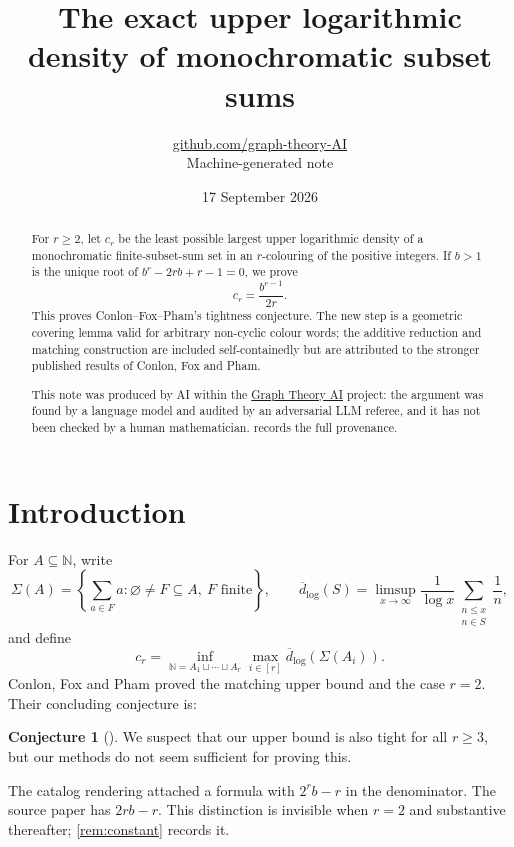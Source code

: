 \documentclass[11pt,a4paper]{article}
\title{The exact upper logarithmic density of monochromatic subset sums}
\author{\href{https://github.com/graph-theory-AI}{github.com/graph-theory-AI}\\[2pt] \normalsize Machine-generated note}
\date{17 September 2026}
\theoremstyle{plain}
\theoremstyle{definition}
\newtheorem{conjecture}[theorem]{Conjecture}
\theoremstyle{remark}
\newcommand{\N}{\mathbb N}
\newcommand{\dlog}{\overline d_{\log}}
\begin{document}
\maketitle
\begin{abstract}
For $r\ge2$, let $c_r$ be the least possible largest upper logarithmic
density of a monochromatic finite-subset-sum set in an $r$-colouring of
the positive integers. If $b>1$ is the unique root of
$b^r-2rb+r-1=0$, we prove
\[
 c_r=\frac{b^{r-1}}{2r}.
\]
This proves Conlon--Fox--Pham's tightness conjecture. The new step is a
geometric covering lemma valid for arbitrary non-cyclic colour words;
the additive reduction and matching construction are included
self-containedly but are attributed to the stronger published results
of Conlon, Fox and Pham.

\medskip\noindent\small
This note was produced by AI within the \href{https://github.com/graph-theory-AI/Graph-Theory-LLM-Proofs}{Graph Theory AI}
project: the argument was found by a language model and audited by an adversarial LLM
referee, and it has not been checked by a human mathematician. 
records the full provenance.
\end{abstract}

\section{Introduction}
For $A\subseteq\N$, write
\[
 \Sigma(A)=\left\{\sum_{a\in F}a:
 \varnothing\ne F\subseteq A,\ F\text{ finite}\right\},
\qquad
 \dlog(S)=\limsup_{x\to\infty}\frac1{\log x}
 \sum_{\substack{n\le x\\n\in S}}\frac1n,
\]
and define
\[
 c_r=\inf_{\N=A_1\sqcup\cdots\sqcup A_r}
 \max_{i\in[r]}\dlog(\Sigma(A_i)).
\]
Conlon, Fox and Pham \cite{CFP22} proved the matching upper bound and
the case $r=2$. Their concluding conjecture is:

\begin{conjecture}[{\cite[Concluding remarks]{CFP22}}]\label{conj:cfp}
We suspect that our upper bound is also tight for all $r\ge3$, but our
methods do not seem sufficient for proving this.
\end{conjecture}

The catalog rendering attached a formula with $2^rb-r$ in the
denominator. The source paper has $2rb-r$. This distinction is invisible
when $r=2$ and substantive thereafter; \cref{rem:constant} records it.
\end{document}
